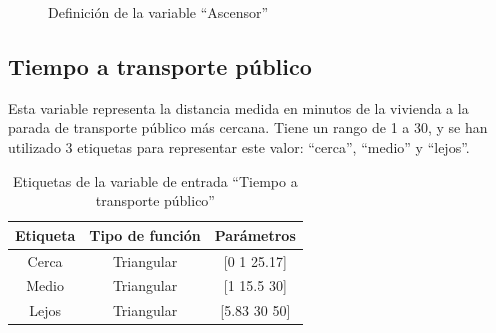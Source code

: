\documentclass[12pt]{report} %
\begin{document}
        \begin{figure}[H]
            \centering
            \caption{Definición de la variable ``Ascensor''}
        \end{figure}

        \subsection{Tiempo a transporte público}
        Esta variable representa la distancia medida en minutos de la vivienda a la parada de transporte público más cercana.
        Tiene un rango de 1 a 30, y se han utilizado 3 etiquetas para representar este valor: ``cerca'', ``medio'' y ``lejos''.

        \begin{table}[h]
            \center
            \begin{tabular}{@{}ccc@{}}
                \toprule
                \textbf{Etiqueta} & \textbf{Tipo de función} & \textbf{Parámetros} \\
                \midrule
                Cerca & Triangular & [0 1 25.17]  \\
                Medio & Triangular & [1 15.5 30]  \\
                Lejos & Triangular & [5.83 30 50] \\
                \bottomrule
            \end{tabular}
            \caption{Etiquetas de la variable de entrada ``Tiempo a transporte público''}
        \end{table}
\end{document}
